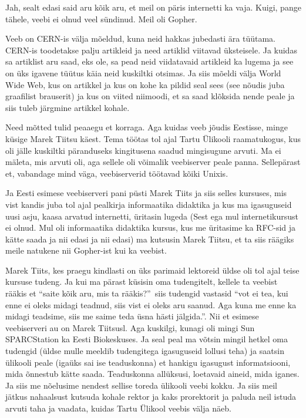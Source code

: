 
Jah, sealt edasi said aru kõik aru, et meil on päris internetti ka vaja. Kuigi, 
pange tähele, veebi ei olnud veel sündinud. Meil oli Gopher. 

Veeb on CERN-is välja mõeldud, kuna neid hakkas jubedasti ära tüütama.  CERN-is 
toodetakse palju artikleid ja need artiklid viitavad üksteisele. Ja kuidas sa 
artiklist aru saad, eks ole, sa pead neid viidatavaid artikleid ka lugema ja 
see on üks igavene tüütus käia neid kuskiltki otsimas. Ja siis mõeldi välja 
World Wide Web, kus on artikkel ja kus on kohe ka  pildid seal sees (see nõudis 
juba graafilist brauserit) ja kus on viited niimoodi, et sa saad klõksida nende 
peale ja siis tuleb järgmine artikkel kohale. 


Need mõtted tulid peaaegu et korraga. Aga kuidas veeb jõudis Eestisse, minge 
küsige Marek Tiitsu käest. Tema töötas tol ajal Tartu 
Ülikooli raamatukogus, kus oli jälle kuskiltki 
päranduseks kingitusena saadud mingisugune arvuti. Ma ei mäleta, mis arvuti 
oli, aga sellele oli  võimalik veebiserver peale panna. Sellepärast et, 
vabandage mind väga, veebiserverid töötavad kõiki Unixis. 

Ja Eesti esimese veebiserveri pani püsti Marek Tiits 
ja siis selles kursuses, mis vist kandis juba tol ajal pealkirja informaatika 
didaktika ja kus ma igasuguseid uusi asju, kaasa arvatud internetti, üritasin 
lugeda (Sest ega mul internetikursust ei olnud. Mul oli informaatika didaktika 
kursus, kus me üritasime ka RFC-sid ja kätte saada ja nii edasi ja nii edasi) 
ma kutsusin Marek Tiitsu, et ta siis räägiks meile natukene nii Gopher-ist kui 
ka veebist. 

Marek Tiits, kes praegu kindlasti on üks parimaid 
lektoreid üldse oli tol ajal teise kursuse tudeng. Ja kui ma pärast küsisin oma 
tudengitelt, kellele ta  veebist rääkis et \enquote{saite kõik aru, mis ta 
rääkis?} siis tudengid vastasid \enquote{vot ei tea, kui enne ei oleks midagi 
teadnud, siis vist ei oleks aru saanud. Aga kuna me enne ka midagi teadsime, 
siis me saime teda üsna hästi jälgida.}. Nii et esimese veebiserveri au on 
Marek Tiitsusl. Aga kuskilgi, kunagi oli mingi Sun SPARCStation  ka Eesti Biokeskuses. Ja seal peal ma 
võtsin mingil hetkel oma tudengid (üldse mulle meeldib tudengitega igasuguseid 
lollusi teha) ja  saatsin ülikooli peale (igaüks sai ise teaduskonna) et 
hankigu igasugust informatsiooni, mida õnnestub kätte saada. Teaduskonna 
allüksusi, loetavaid aineid, mida iganes. Ja siis me nõelusime nendest sellise 
toreda ülikooli veebi kokku. Ja siis meil jätkus nahaalsust kutsuda kohale 
rektor ja kaks prorektorit ja paluda neil istuda arvuti taha ja vaadata, kuidas 
Tartu Ülikool veebis välja näeb. 

